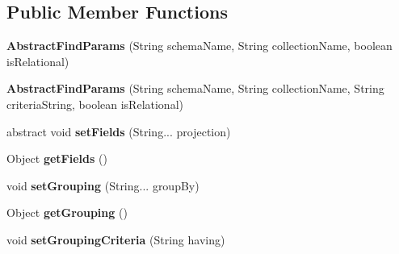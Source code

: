 \subsection*{Public Member Functions}
\begin{DoxyCompactItemize}
\item 
\mbox{\label{classcom_1_1mysql_1_1cj_1_1xdevapi_1_1_abstract_find_params_a1a25b8361fcaa3bb7b30a1a3f5fa51f7}} 
{\bfseries Abstract\+Find\+Params} (String schema\+Name, String collection\+Name, boolean is\+Relational)
\item 
\mbox{\label{classcom_1_1mysql_1_1cj_1_1xdevapi_1_1_abstract_find_params_a77a35f3333221318a073b1f52faee04f}} 
{\bfseries Abstract\+Find\+Params} (String schema\+Name, String collection\+Name, String criteria\+String, boolean is\+Relational)
\item 
\mbox{\label{classcom_1_1mysql_1_1cj_1_1xdevapi_1_1_abstract_find_params_a65e9b75d89ac2fa9d13280bcba7404f3}} 
abstract void {\bfseries set\+Fields} (String... projection)
\item 
\mbox{\label{classcom_1_1mysql_1_1cj_1_1xdevapi_1_1_abstract_find_params_aec128ea6b15a2530e3bfb119bab740dc}} 
Object {\bfseries get\+Fields} ()
\item 
\mbox{\label{classcom_1_1mysql_1_1cj_1_1xdevapi_1_1_abstract_find_params_a073faf8afae62dea57a7af9dd31988e8}} 
void {\bfseries set\+Grouping} (String... group\+By)
\item 
\mbox{\label{classcom_1_1mysql_1_1cj_1_1xdevapi_1_1_abstract_find_params_a5b322e19422e65c1e08db87b16ce77f0}} 
Object {\bfseries get\+Grouping} ()
\item 
\mbox{\label{classcom_1_1mysql_1_1cj_1_1xdevapi_1_1_abstract_find_params_a8e7b9f8acb811c6da58817a5d09e0444}} 
void {\bfseries set\+Grouping\+Criteria} (String having)
\item 

\end{DoxyCompactItemize}
